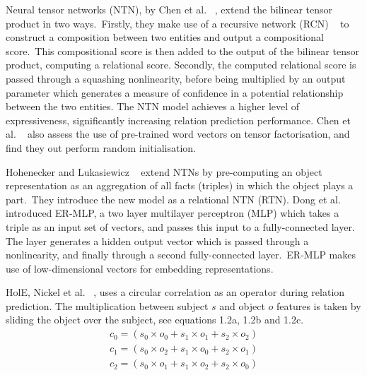 \noindent Neural tensor networks (NTN), by Chen et al. \unskip~\citep{socher2013reasoning}, extend the bilinear tensor product in two ways.\ Firstly, they make use of a recursive network (RCN) \unskip~\citep{socher2012semantic} to construct a composition between two entities and output a compositional score.\ This compositional score is then added to the output of the bilinear tensor product, computing a relational score. Secondly, the computed relational score is passed through a squashing nonlinearity, before being multiplied by an output parameter which generates a measure of confidence in a potential relationship between the two entities. The NTN model achieves a higher level of expressiveness, significantly increasing relation prediction performance. Chen et al. \unskip~\citep{socher2013reasoning} also assess the use of pre-trained word vectors on tensor factorisation, and find they out perform random initialisation. \par

\noindent Hohenecker and Lukasiewicz \unskip~\citep{hohenecker2017deep} extend NTNs by pre-computing an object representation as an aggregation of all facts (triples) in which the object plays a part.\ They introduce the new model as a relational NTN (RTN). Dong et al. \unskip~\citep{dong2014knowledge} introduced ER-MLP, a two layer multilayer perceptron (MLP) which takes a triple as an input set of vectors, and passes this input to a fully-connected layer. The layer generates a hidden output vector which is passed through a nonlinearity, and finally through a second fully-connected layer.\ ER-MLP makes use of low-dimensional vectors for embedding representations. \par

\noindent HolE, Nickel et al. \unskip~\citep{nickel2016holographic}, uses a circular correlation as an operator during relation prediction. The multiplication between subject $ s $ and object $ o $ features is taken by sliding the object over the subject, see equations 1.2a, 1.2b and 1.2c. 
\begin{subequations}
	\begin{gather}
		c_0 =  (s_0 \times o_0 + s_1 \times o_1 + s_2 \times o_2) \\
		c_1 =  (s_0 \times o_2 + s_1 \times o_0 + s_2 \times o_1) \\
		c_2 =  (s_0 \times o_1 + s_1 \times o_2 + s_2 \times o_0) 
	\end{gather}
\end{subequations}


